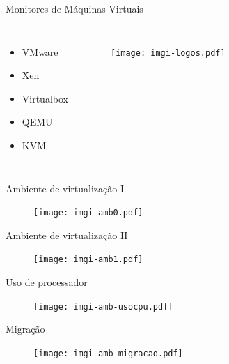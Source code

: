 \documentclass{beamer}
\begin{document}
\begin{frame}{Monitores de Máquinas Virtuais}
\begin{columns}[c]
\column{1.5in}
\begin{itemize}
  \item VMware
  \item Xen
  \item Virtualbox
  \item QEMU
  \item KVM
\end{itemize}
\column{1.5in}
\begin{figure}
\centering
\texttt{[image: imgi-logos.pdf]}
\end{figure}
\end{columns}
\end{frame}


\begin{frame}{Ambiente de virtualização I}
\begin{figure}
\centering
\texttt{[image: imgi-amb0.pdf]}
\end{figure}
\end{frame}

\begin{frame}{Ambiente de virtualização II}
\begin{figure}
\texttt{[image: imgi-amb1.pdf]}
\end{figure}
\end{frame}

\begin{frame}{Uso de processador}
\begin{figure}
\centering
\texttt{[image: imgi-amb-usocpu.pdf]}
\end{figure}
\end{frame}

\begin{frame}{Migração}
\begin{figure}
\centering
\texttt{[image: imgi-amb-migracao.pdf]}
\end{figure}
\end{frame}
\end{document}
